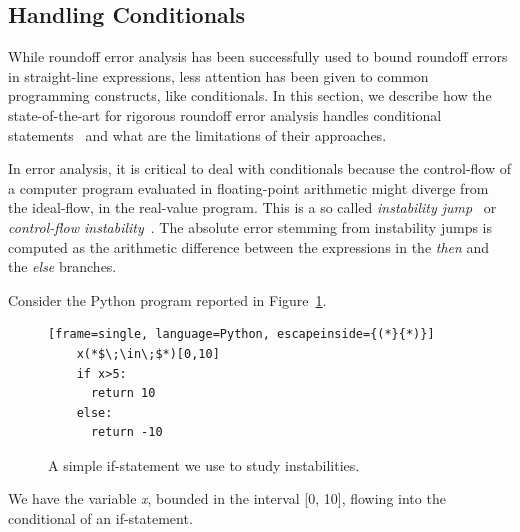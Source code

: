 \subsection{Handling Conditionals}
\label{conditionals}
%
While roundoff error analysis has been successfully used to bound roundoff errors in straight-line expressions, less attention has been given to common programming constructs, like conditionals.
%
In this section, we describe how the state-of-the-art for rigorous roundoff error analysis handles conditional statements~\cite{precisa, fluctuat} and what are the limitations of their approaches.
%

In error analysis, it is critical to deal with conditionals because the control-flow of a computer program evaluated in floating-point arithmetic might diverge from the ideal-flow, in the real-value program.
%
%
This is a so called \emph{instability jump}~\cite{satire} or \emph{control-flow instability}~\cite{unstable}.
%
The absolute error stemming from instability jumps is computed as the arithmetic difference between the expressions in the \emph{then} and the \emph{else} branches.
%
%

Consider the Python program reported in Figure~\ref{fig:ifstatement}.
%
\begin{figure}[tb!]
	\begin{lstlisting}[frame=single, language=Python, escapeinside={(*}{*)}]
	x(*$\;\in\;$*)[0,10]
	if x>5:
	  return 10
	else:
	  return -10	
	\end{lstlisting}
	\caption{A simple if-statement we use to study instabilities.}\label{fig:ifstatement}
\end{figure}
%
We have the variable \emph{x}, bounded in the interval [0, 10], flowing into the conditional of an if-statement.
%

